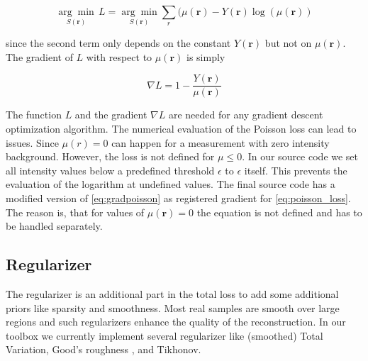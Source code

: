 \documentclass{juliacon}
\begin{document}
\begin{equation}
    \underset{S(\mathbf r)}{\arg \min}\, L = \underset{S(\mathbf r)}{\arg \min} \sum_r (\mu(\mathbf r)  - Y(\mathbf r) \log(\mu(\mathbf r))
    \label{eq:poisson_loss}
\end{equation}

since the second term only depends on the constant $Y(\mathbf r)$ but not on $\mu(\mathbf r)$.
The gradient of $L$ with respect to $\mu(\mathbf r)$ is simply

\begin{equation}
    \nabla L = 1 - \frac{Y(\mathbf r)}{\mu(\mathbf r)}
    \label{eq:gradpoisson}
\end{equation}

The function $L$ and the gradient $\nabla L$ are needed for any gradient descent optimization algorithm.
The numerical evaluation of the Poisson loss can lead to issues. Since $\mu(r)=0$ can happen for a measurement with zero intensity background. However, the loss is not defined for $\mu \leq 0$. In our source code we set all intensity values below a predefined threshold $\epsilon$ to $\epsilon$ itself. This prevents the evaluation of the logarithm at undefined values.
The final source code has a modified version of \autoref{eq:gradpoisson} as registered gradient for \autoref{eq:poisson_loss}.
The reason is, that for values of $\mu(\mathbf r) = 0$ the equation is not defined and has to be handled separately. 

\subsection{Regularizer}
    The regularizer is an additional part in the total loss to add some additional priors like sparsity and smoothness.
    Most real samples are smooth over large regions and such regularizers enhance the quality of the reconstruction.
    In our toolbox we currently implement several regularizer like (smoothed) Total Variation, Good's roughness \cite{Verveer:98}, \cite{Good:71} and Tikhonov. 
\end{document}
